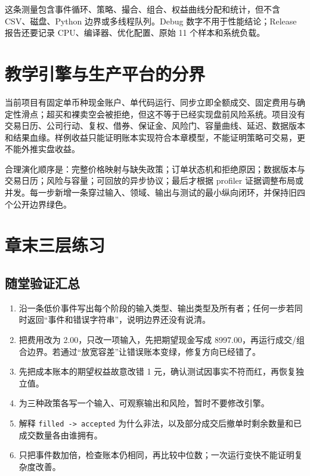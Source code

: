 

这条测量包含事件循环、策略、撮合、组合、权益曲线分配和统计，但不含 CSV、磁盘、Python 边界或多线程队列。Debug 数字不用于性能结论；Release 报告还要记录 CPU、编译器、优化配置、原始 11 个样本和系统负载。

\section{教学引擎与生产平台的分界}

当前项目有固定单币种现金账户、单代码运行、同步立即全额成交、固定费用与确定性滑点；超买和裸卖空会被拒绝，但这不等于已经实现盘前风险系统。项目没有交易日历、公司行动、复权、借券、保证金、风险门、容量曲线、延迟、数据版本和结果血缘。样例收益只能证明账本实现符合本章模型，不能证明策略可交易，更不能外推实盘收益。

合理演化顺序是：完整价格映射与缺失政策；订单状态机和拒绝原因；数据版本与交易日历；风险与容量；可回放的异步协议；最后才根据 profiler 证据调整布局或并发。每一步新增一条穿过输入、领域、输出与测试的最小纵向闭环，并保持旧四个公开边界绿色。


\section{章末三层练习}

\subsection*{随堂验证汇总}

\begin{enumerate}
  \item 沿一条低价事件写出每个阶段的输入类型、输出类型及所有者；任何一步若同时返回“事件和错误字符串”，说明边界还没有说清。
  \item 把费用改为 2.00，只改一项输入，先把期望现金写成 8997.00，再运行成交/组合边界。若通过“放宽容差”让错误账本变绿，修复方向已经错了。
  \item 先把成本账本的期望权益故意改错 1 元，确认测试因事实不符而红，再恢复独立值。
  \item 为三种政策各写一个输入、可观察输出和风险，暂时不要修改引擎。
  \item 解释 \texttt{filled -> accepted} 为什么非法，以及部分成交后撤单时剩余数量和已成交数量各由谁拥有。
  \item 只把事件数加倍，检查账本仍相同，再比较中位数；一次运行变快不能证明复杂度改善。
\end{enumerate}


